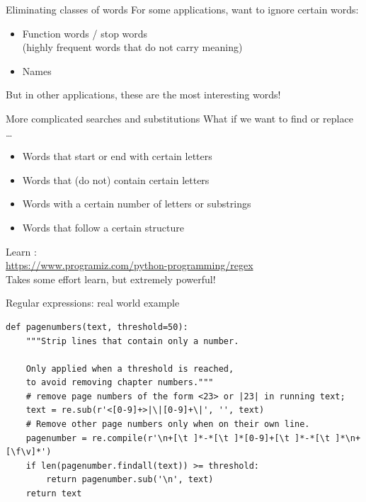 \documentclass[aspectratio=169,usenames,dvipsnames]{beamer}
\begin{document}
\begin{frame}{Eliminating classes of words}
    For some applications, want to ignore certain words:
    \begin{itemize}
        \item Function words / stop words \\
            (highly frequent words that do not carry meaning)
        \item Names
    \end{itemize}

    \vspace{1em}
    But in other applications, these are the most interesting words!
\end{frame}

\begin{frame}{More complicated searches and substitutions}
What if we want to find or replace \dots
\begin{itemize}
    \item Words that start or end with certain letters
    \item Words that (do not) contain certain letters
    \item Words with a certain number of letters or substrings
    \item Words that follow a certain structure
\end{itemize}

Learn :\\
\url{https://www.programiz.com/python-programming/regex} \\

\vspace{1em}
Takes some effort learn, but extremely powerful!
\end{frame}

\begin{frame}[fragile]{Regular expressions: real world example}
\begin{lstlisting}
def pagenumbers(text, threshold=50):
    """Strip lines that contain only a number.

    Only applied when a threshold is reached,
    to avoid removing chapter numbers."""
    # remove page numbers of the form <23> or |23| in running text;
    text = re.sub(r'<[0-9]+>|\|[0-9]+\|', '', text)
    # Remove other page numbers only when on their own line.
    pagenumber = re.compile(r'\n+[\t ]*-*[\t ]*[0-9]+[\t ]*-*[\t ]*\n+[\f\v]*')
    if len(pagenumber.findall(text)) >= threshold:
        return pagenumber.sub('\n', text)
    return text
\end{lstlisting}
\end{frame}
\end{document}
